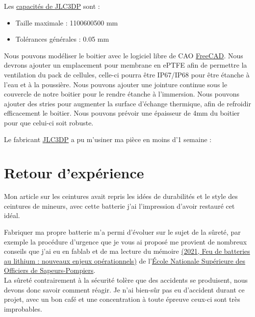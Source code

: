 \documentclass[a4paper,11pt]{article}
\begin{document}
\begin{blogmain}
Les \href{https://jlccnc.com/cnc-machining}{capacités de JLC3DP} sont :
\begin{itemize}
  \item Taille maximale : 1100\times{}600\times{}500 mm
  \item Tolérances générales : \pm{}0.05 mm
\end{itemize}

Nous pouvons modéliser le boitier avec le logiciel libre de CAO \href{https://www.freecad.org/index.php?lang=fr}{FreeCAD}.
Nous devrons ajouter un emplacement pour membrane en ePTFE afin de permettre la ventilation du pack de cellules, celle-ci pourra être IP67/IP68 pour être étanche à l’eau et à la poussière.
Nous pouvons ajouter une jointure continue sous le couvercle de notre boitier pour le rendre étanche à l'immersion.
Nous pouvons ajouter des stries pour augmenter la surface d'échange thermique, afin de refroidir efficacement le boitier.
Nous pouvons prévoir une épaisseur de 4mm du boitier pour que celui-ci soit robuste.


Le fabricant \href{https://jlccnc.com}{JLC3DP} a pu m'usiner ma pièce en moins d'1 semaine :


\newpage
\section{Retour d'expérience}
Mon article  sur les ceintures avait repris les idées de durabilités et le style des ceintures de mineurs, avec cette batterie j'ai l'impression d'avoir restauré cet idéal.

Fabriquer ma propre batterie m'a permi d'évoluer sur le sujet de la sûreté, par exemple la procédure d'urgence que je vous ai proposé me provient de nombreux conseils que j'ai eu en fablab et de ma lecture du mémoire \href{https://pnrs.ensosp.fr/Default/doc/SYRACUSE/5174/feu-de-batteries-au-lithium-nouveaux-enjeux-operationnels}{(2021, Feu de batteries au lithium : nouveaux enjeux opérationnels)} de l'\href{https://www.ensosp.fr}{École Nationale Supérieure des Officiers de Sapeurs-Pompiers}. \\

La sûreté contrairement à la sécurité tolère que des accidents se produisent, nous devons donc savoir comment réagir.
Je n'ai bien-sûr pas eu d'accident durant ce projet, avec un bon café et une concentration à toute épreuve ceux-ci sont très improbables. \\


\end{blogmain}
\end{document}
